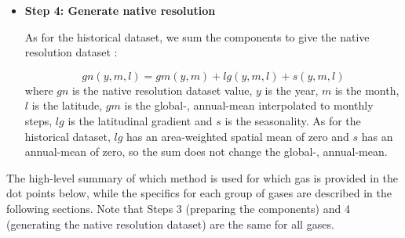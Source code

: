 \begin{itemize}
{        As for the historical dataset (and for the same reason),
        the global-, annual-mean and latitudinal gradient PCs are interpolated to monthly timesteps
        using mean-preserving interpolation.
        This interpolation is done such that the experiments with the same harmonisation year
        are identical up to the end of that year and agree with the historical dataset.
        As for the historical dataset, we adjust the seasonality and latitudinal gradient where needed to avoid negative values.
    }

    \item {
        \textbf{Step 4: Generate native resolution}

        As for the historical dataset, we sum the components to give the native resolution dataset \citep{nicholls_historical-ghgs_2026}:

        \begin{equation}
            \label{eq:native-resolution-sum}
            gn(y, m, l) = gm(y, m) + lg(y, m, l) + s(y, m, l)
        \end{equation}
        where $gn$ is the native resolution dataset value,
        $y$ is the year,
        $m$ is the month,
        $l$ is the latitude,
        $gm$ is the global-, annual-mean interpolated to monthly steps,
        $lg$ is the latitudinal gradient
        and $s$ is the seasonality.
        As for the historical dataset, $lg$ has an area-weighted spatial mean of zero
        and $s$ has an annual-mean of zero,
        so the sum does not change the global-, annual-mean.
    }

\end{itemize}

The high-level summary of which method is used for which gas is provided in the dot points below,
while the specifics for each group of gases are described in the following sections.
Note that Steps 3 (preparing the components) and 4 (generating the native resolution dataset)
are the same for all gases.

